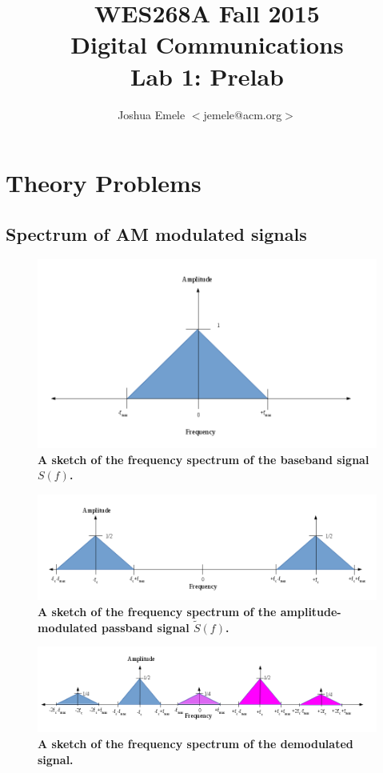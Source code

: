 \documentclass[letterpaper,12pt]{article}
\begin{document}
\title{WES268A Fall 2015 \\ Digital Communications \\ Lab 1: Prelab}
\author{Joshua Emele $<$jemele@acm.org$>$}
\maketitle

\section{Theory Problems}

\subsection{Spectrum of AM modulated signals}
\begin{figure}[hbtp]
\includegraphics[width=0.6\columnwidth]{prelab1-figure1}
\caption{
\label{fig:prelab1-figure1}
{\bf A sketch of the frequency spectrum of the baseband signal $S(f)$.
}
}
\end{figure}

\begin{figure}[hbtp]
\includegraphics[width=1.0\columnwidth]{prelab1-figure1a}
\caption{
\label{fig:prelab1-figure1a}
{\bf A sketch of the frequency spectrum of the amplitude-modulated passband
signal $\tilde{S}(f)$.
}
}
\end{figure}

\begin{figure}[hbtp]
\includegraphics[width=1.0\columnwidth]{prelab1-figure1b}
\caption{
\label{fig:prelab1-figure1b}
{\bf A sketch of the frequency spectrum of the demodulated signal.
}
}
\end{figure}
\pagebreak
\end{document}
